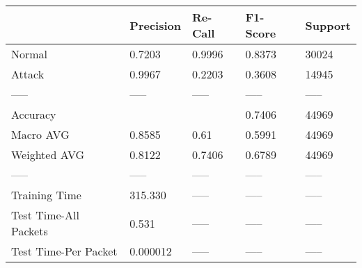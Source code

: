 \begin{tabular}{lllll}
\toprule
{} & Precision & Re-Call & F1-Score & Support \\
\midrule
Normal                &    0.7203 &  0.9996 &   0.8373 &   30024 \\
Attack                &    0.9967 &  0.2203 &   0.3608 &   14945 \\
-----                 &     ----- &   ----- &    ----- &   ----- \\
Accuracy              &           &         &   0.7406 &   44969 \\
Macro AVG             &    0.8585 &    0.61 &   0.5991 &   44969 \\
Weighted AVG          &    0.8122 &  0.7406 &   0.6789 &   44969 \\
-----                 &     ----- &   ----- &    ----- &   ----- \\
Training Time         &   315.330 &   ----- &    ----- &   ----- \\
Test Time-All Packets &     0.531 &   ----- &    ----- &   ----- \\
Test Time-Per Packet  &  0.000012 &   ----- &    ----- &   ----- \\
\bottomrule
\end{tabular}

